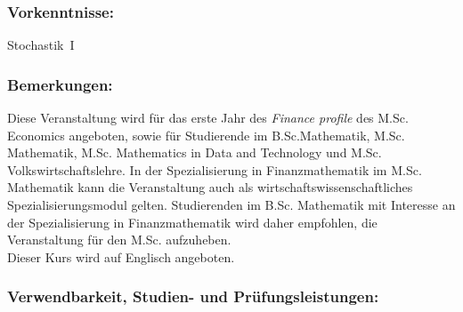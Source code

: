\documentclass[a4paper,10pt]{article}
\begin{document}
\subsubsection*{\large
    Vorkenntnisse:
}
Stochastik~I
\subsubsection*{\large
    Bemerkungen:
}
Diese Veranstaltung wird für das erste Jahr des {\em Finance profile} des M.Sc. Economics angeboten, sowie für Studierende im B.Sc.Mathematik, M.Sc. Mathematik, M.Sc. Mathematics in Data and Technology und M.Sc. Volkswirtschaftslehre. In der Spezialisierung in Finanzmathematik im M.Sc. Mathematik kann die Veranstaltung auch als wirtschaftswissenschaftliches Spezialisierungsmodul gelten. Studierenden im B.Sc. Mathematik mit Interesse an der Spezialisierung in Finanzmathematik wird daher empfohlen, die Veranstaltung für den M.Sc. aufzuheben.\\ Dieser Kurs wird auf Englisch angeboten.
\subsubsection*{\large
    Verwendbarkeit, Studien- und Prüfungsleistungen:
}
\end{document}
